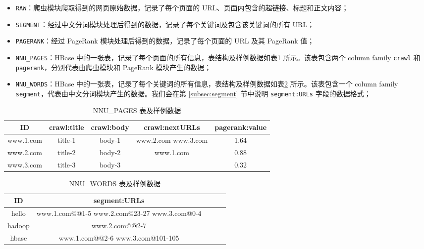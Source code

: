 \documentclass{ctexart}
\newcommand{\code}[1]{\colorbox{backcolor}{\lstinline|#1|}}
\begin{document}
    \begin{itemize}
        \item \code{RAW}：爬虫模块爬取得到的网页原始数据，记录了每个页面的 URL、页面内包含的超链接、标题和正文内容；
        \item \code{SEGMENT}：经过中文分词模块处理后得到的数据，记录了每个关键词及包含该关键词的所有 URL；
        \item \code{PAGERANK}：经过 PageRank 模块处理后得到的数据，记录了每个页面的 URL 及其 PageRank 值；
        \item \code{NNU_PAGES}：HBase 中的一张表，记录了每个页面的所有信息，表结构及样例数据如表\ref{tab:archicture_nnu-pages} 所示。该表包含两个 column family \code{crawl} 和 \code{pagerank}，分别代表由爬虫模块和 PageRank 模块产生的数据；
        \item \code{NNU_WORDS}：HBase 中的一张表，记录了每个关键词的所有信息，表结构及样例数据如表\ref{tab:archicture_nnu-words} 所示。该表包含一个 column family \code{segment}，代表由中文分词模块产生的数据。我们会在第 \ref{subsec:segment} 节中说明 \code{segment:URLs} 字段的数据格式；
    \end{itemize}

    \begin{table}[h]
        \centering
        \caption{NNU\_PAGES 表及样例数据}
        \label{tab:archicture_nnu-pages}
        \begin{tabular}{c|cccc}
            \hline
            ID        & crawl:title & crawl:body & crawl:nextURLs      & pagerank:value \\ \hline
            www.1.com & title-1     & body-1     & www.2.com www.3.com & 1.64           \\
            www.2.com & title-2     & body-2     & www.1.com           & 0.88           \\
            www.3.com & title-3     & body-3     &                     & 0.32           \\ \hline
        \end{tabular}
    \end{table}

    \begin{table}[h]
        \centering
        \caption{NNU\_WORDS 表及样例数据}
        \label{tab:archicture_nnu-words}
        \begin{tabular}{c|cccc}
            \hline
            ID     & segment:URLs                                 \\ \hline
            hello  & www.1.com@@1-5 www.2.com@23-27 www.3.com@0-4 \\
            hadoop & www.2.com@@2-7                               \\
            hbase  & www.1.com@@2-6 www.3.com@101-105             \\ \hline
        \end{tabular}
    \end{table}
\end{document}
